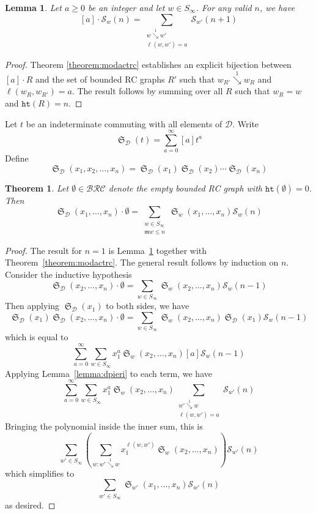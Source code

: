 \documentclass[a4paper,fleqn]{cas-sc}
\newtheorem{lemma}{Lemma}[subsection]
\newtheorem{theorem}{Theorem}[section]
\theoremstyle{definition}
\theoremstyle{remark}
\numberwithin{equation}{subsection}
\DeclareMathOperator{\sch}{\mathfrak{S}}
\newcommand{\downvar}[1]{\stackrel{#1}{\searrow}}
\newcommand{\wof}[1]{w_{#1}}
\newcommand{\hr}{\mathtt{ht}}
\newcommand{\BRC}{\mathcal{BRC}}
\newcommand{\dcoma}{\mathcal{D}}
\newcommand{\maxd}{\mathfrak{m}}
\begin{document}
\begin{lemma} \label{lemma:drcpieri}
	Let $a\geq 0$ be an integer and let $w\in S_\infty$. For any valid $n$, we have
	$$[a]\cdot \mathcal{S}_w(n) = \sum_{\substack{w\downvar{1} w'\\\ell(w,w')=a}} \mathcal{S}_{w'}(n+1)$$
\end{lemma}
\begin{proof}
Theorem \ref{theorem:modactrc} establishes an explicit bijection between $[a]\cdot R$ and the set of bounded RC graphs $R'$ such that $\wof{R'}\downvar{1}\wof{R}$ and $\ell(\wof{R},\wof{R'})=a$. The result follows by summing over all $R$ such that $\wof{R}=w$ and $\hr(R)=n$.
\end{proof}

Let $t$ be an indeterminate commuting with all elements of $\dcoma$. Write
$$\sch_\dcoma(t) = \sum_{a=0}^\infty [a]t^a$$
Define
$$\sch_\dcoma(x_1,x_2,\ldots,x_n) = \sch_\dcoma(x_1)\sch_\dcoma(x_2)\cdots \sch_\dcoma(x_n)$$

\begin{theorem}
	Let $\emptyset\in \BRC$ denote the empty bounded RC graph with $\hr(\emptyset)=0$. Then
  $$\sch_\dcoma(x_1,\ldots,x_n)\cdot \emptyset=\sum_{\substack{w\in S_\infty\\ \maxd{w}\leq n}}\sch_w(x_1,\ldots,x_n)\mathcal{S}_w(n)$$
\end{theorem}
\begin{proof}
	The result for $n=1$ is Lemma~\ref{lemma:drcpieri} together with Theorem~\ref{theorem:modactrc}. The general result follows by induction on $n$. Consider the inductive hypothesis
	$$\sch_\dcoma(x_2,\ldots,x_n)\cdot \emptyset=\sum_{w\in S_\infty}\sch_w(x_2,\ldots,x_n)\mathcal{S}_w(n-1)$$
	Then applying $\sch_\dcoma(x_1)$ to both sides, we have
	$$\sch_\dcoma(x_1)\sch_\dcoma(x_2,\ldots,x_n)\cdot \emptyset=\sum_{w\in S_\infty}\sch_w(x_2,\ldots,x_n)\sch_\dcoma(x_1)\mathcal{S}_w(n-1)$$
	which is equal to
	$$\sum_{a=0}^\infty\sum_{w\in S_\infty}x_1^a\sch_w(x_2,\ldots,x_n)[a]\mathcal{S}_w(n-1)$$
	Applying Lemma~\ref{lemma:dpieri} to each term, we have
	$$\sum_{a=0}^\infty\sum_{w\in S_\infty}x_1^a\sch_w(x_2,\ldots,x_n)\sum_{\substack{w'\downvar{1} w\\\ell(w,w')=a}} \mathcal{S}_{w'}(n)$$
	Bringing the polynomial inside the inner sum, this is
	$$\sum_{w'\in S_\infty}\left(\sum_{w:w'\downvar{1}w} x_1^{\ell(w,w')}\sch_w(x_2,\ldots,x_n)\right)\mathcal{S}_{w'}(n)$$
	which simplifies to
	$$\sum_{w'\in S_\infty}\sch_{w'}(x_1,\ldots,x_n)\mathcal{S}_{w'}(n)$$
	as desired.
\end{proof}
\end{document}
